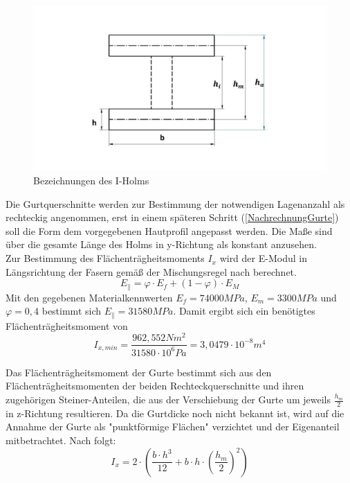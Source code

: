\begin{figure}[h]
	\includegraphics[width=1.0\textwidth]{Bilder/RechteckHolm.jpg}
	\caption{Bezeichnungen des I-Holms}
	\label{fig: Rechteckholm}
\end{figure}

\noindent Die Gurtquerschnitte werden zur Bestimmung der notwendigen Lagenanzahl als rechteckig angenommen, erst in einem späteren Schritt (\ref{NachrechnungGurte}) soll die Form dem vorgegebenen Hautprofil angepasst werden. Die Maße sind über die gesamte Länge des Holms in y-Richtung als konstant anzusehen.\\
Zur Bestimmung des Flächenträgheitsmoments $ I_{x} $ wird der E-Modul in Längsrichtung der Fasern gemäß der Mischungsregel nach \cite{item3} berechnet.\\
\begin{equation}
 E_{\|}=  \varphi\cdot E_{f}+\left( 1-\varphi \right) \cdot E_{M}
\end{equation}
Mit den gegebenen Materialkennwerten $ E_{f}=74000MPa $, $ E_{m}=3300MPa $ und $ \varphi=0,4 $ bestimmt sich $ E_{\|} = 31580 MPa $. Damit ergibt sich ein benötigtes Flächenträgheitsmoment von 
\begin{equation}
	I_{x,min} = \frac{962,552Nm^{2}}{31580\cdot 10^{6}Pa} =3,0479 \cdot 10^{-8} m^{4}
\end{equation}

\noindent Das Flächenträgheitsmoment der Gurte bestimmt sich aus den Flächenträgheitsmomenten der beiden Rechteckquerschnitte und ihren zugehörigen Steiner-Anteilen, die aus der Verschiebung der Gurte um jeweils $ \frac{h_{m}}{2} $ in z-Richtung resultieren. Da die Gurtdicke noch nicht bekannt ist, wird auf die Annahme der Gurte als "punktförmige Flächen" \cite{item15} verzichtet und der Eigenanteil mitbetrachtet. Nach \cite{item16} folgt: 
\begin{equation}
	\label{Ix}
	I_{x}=2\cdot\left(\frac{b\cdot h^{3}}{12}+b\cdot h\cdot\left(\frac{h_{m}}{2}\right)^{2}\right)
\end{equation}


